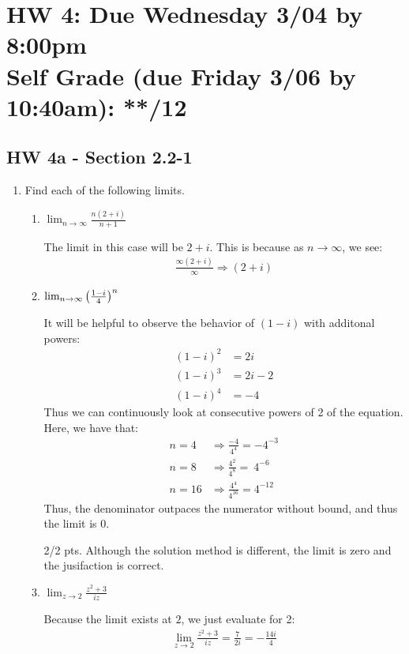 
\newpage
\section*{HW 4: Due Wednesday 3/04 by 8:00pm \\ Self Grade (due Friday 3/06 by 10:40am): **/12} 
\subsection*{HW 4a - Section 2.2-1}
\begin{enumerate}
\item Find each of the following limits.
	\begin{enumerate}
	\item $\lim_{n\to \infty} \frac{n(2+i)}{n+1}$
	\begin{problem}
		The limit in this case will be $2+i$. This is because as $n\to\infty$, we see:
		\begin{align*}
			\frac{\infty(2+i)}{\infty} \Rightarrow (2+i)
		\end{align*}
	\end{problem}
	\item $\lim_{n\to \infty} \left(\frac{1-i}{4}\right) ^n$
	\begin{problem}
		It will be helpful to observe the behavior of $(1-i)$ with additonal powers:
		\begin{align*}
			(1-i)^2 &= 2i \\
			(1-i)^3 &= 2i-2\\
			(1-i)^4 &= -4
		\end{align*}
		Thus we can continuously look at consecutive powers of 2 of the equation. Here, we have that:
		\begin{align*}
			n =4 &\Rightarrow \frac{-4}{4^4} = -4^{-3}\\
			n = 8 &\Rightarrow \frac{4^2}{4^8} = \ 4^{-6}\\
			n = 16 &\Rightarrow \frac{4^4}{4^{16}} =  4^{-12}
		\end{align*}
		Thus, the denominator outpaces the numerator without bound, and thus the limit is 0. 
	\end{problem}
	\begin{grade}
		2/2 pts. Although the solution method is different, the limit is zero and the jusifaction is correct.
	\end{grade}
	\item $\lim_{z\to 2} \frac{z^2 +3}{iz}$
	\begin{problem}
		Because the limit exists at $2$, we just evaluate for 2:
		\begin{align*}
			\lim_{z\to2}\frac{z^2+3}{iz}=\frac{7}{2i}=-\frac{14i}{4}
		\end{align*}
	\end{problem}


\end{enumerate}
\end{enumerate}
